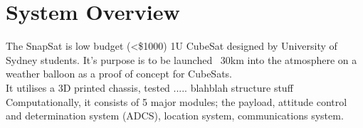 \section{System Overview}

The SnapSat is low budget (<\$1000) 1U CubeSat designed by University of Sydney students. It's purpose is to be launched ~30km into the atmosphere on a weather balloon as a proof of concept for CubeSats.\\

It utilises a 3D printed chassis, tested ..... blahblah structure stuff \\

Computationally, it consists of 5 major modules; the payload, attitude control and determination system (ADCS), location system, communications system. \\